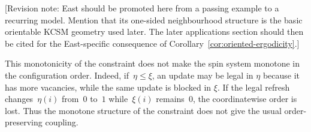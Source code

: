 
\textcolor{revisionpurple}{[Revision note: East should be promoted here from a
passing example to a recurring model. Mention that its one-sided neighbourhood
structure is the basic orientable KCSM geometry used later. The later
applications section should then be cited for the East-specific consequence of
Corollary~\ref{cor:oriented-ergodicity}.]}

%
%
%

This monotonicity of the constraint does not make the spin system monotone in
the configuration order. Indeed, if~$\eta\leq\xi$, an update may be legal in
$\eta$ because it has more vacancies, while the same update is blocked in
$\xi$. If the legal refresh changes~$\eta(i)$ from~$0$ to~$1$ while~$\xi(i)$
remains~$0$, the coordinatewise order is lost. Thus the monotone structure of
the constraint does not give the usual order-preserving coupling.



%
%
%

